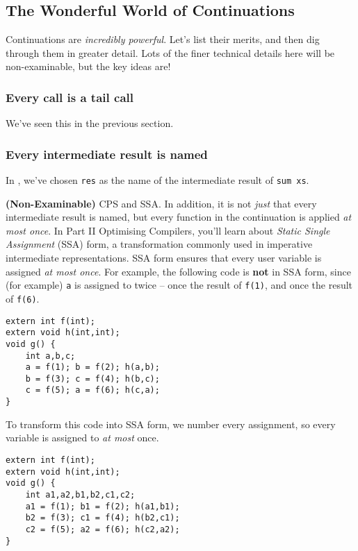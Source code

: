 \subsection{The Wonderful World of Continuations}
Continuations are \emph{incredibly powerful}. Let's list their merits, and then dig through them in greater detail. Lots of the finer technical details here will be non-examinable, but the key ideas are!

\subsubsection{Every call is a tail call}
We've seen this in the previous section.

\subsubsection{Every intermediate result is named}
In , we've chosen \texttt{res} as the name of the intermediate result of \texttt{sum xs}.

{\sffamily \textbf{(Non-Examinable)} CPS and SSA.} In addition, it is not \emph{just} that every intermediate result is named, but every function in the continuation is applied \emph{at most once}. In {\sffamily Part II Optimising Compilers}, you'll learn about \textit{Static Single Assignment} (SSA) form, a transformation commonly used in imperative intermediate representations. SSA form ensures that every user variable is assigned \textit{at most once}. For example, the following code is \textbf{not} in SSA form, since (for example) \texttt{a} is assigned to twice -- once the result of \texttt{f(1)}, and once the result of \texttt{f(6)}.

\begin{code}
\label{code:fib-ocaml-again}
\begin{verbatim}
extern int f(int); 
extern void h(int,int); 
void g() {   
    int a,b,c;   
    a = f(1); b = f(2); h(a,b);   
    b = f(3); c = f(4); h(b,c);   
    c = f(5); a = f(6); h(c,a); 
}
\end{verbatim}
\end{code}

To transform this code into SSA form, we number every assignment, so every variable is assigned to \emph{at most} once. 

\begin{code}
\label{code:fib-ocaml-again}
\begin{verbatim}
extern int f(int); 
extern void h(int,int); 
void g() {   
    int a1,a2,b1,b2,c1,c2;   
    a1 = f(1); b1 = f(2); h(a1,b1);   
    b2 = f(3); c1 = f(4); h(b2,c1);   
    c2 = f(5); a2 = f(6); h(c2,a2); 
}
\end{verbatim}
\end{code}


